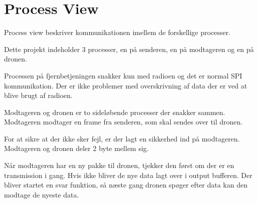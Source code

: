 \documentclass[Main]{subfiles}
\begin{document}
\section{Process View}
Process view beskriver kommunikationen imellem de forskellige processer.

Dette projekt indeholder 3 processer, en på senderen, en på modtageren og en på dronen.

Processen på fjernbetjeningen snakker kun med radioen og det er normal SPI kommunikation. Der er ikke problemer med overskrivning af data der er ved at blive brugt af radioen.

Modtageren og dronen er to sideløbende processer der snakker sammen.
Modtageren modtager en frame fra senderen, som skal sendes over \itoc til dronen.

For at sikre at der ikke sker fejl, er der lagt en sikkerhed ind på modtageren. Modtageren og dronen deler 2 byte mellem sig.

Når modtageren har en ny pakke til dronen, tjekker den først om der er en \itoc transmission i gang. Hvis ikke bliver de nye data lagt over i output bufferen. Der bliver startet en svar funktion, så næste gang dronen spøger efter data kan den modtage de nyeste data.
\end{document}
